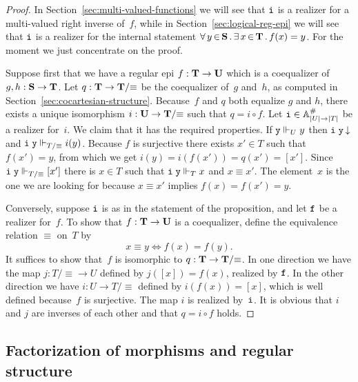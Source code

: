 \begin{proof}
  In Section~\ref{sec:multi-valued-functions} we will see that $\mathtt{i}$
  is a realizer for a multi-valued right inverse of~$f$, while
  in Section~\ref{sec:logical-reg-epi} we will see that $\mathtt{i}$ is a
  realizer for the internal statement
  $\forall\, y \,{\in}\, \mathbf{S}\,.\,\exists\, x \,{\in}\, \mathbf{T}\,.\,f(x) = y$. For the moment we
  just concentrate on the proof.

  Suppose first that we have a regular epi $f : \mathbf{T} \to \mathbf{U}$
  which is a coequalizer of~$g, h : \mathbf{S} \to \mathbf{T}$. Let $q :
  \mathbf{T} \to \mathbf{T}/{\equiv}$ be the coequalizer of~$g$ and~$h$, as
  computed in Section~\ref{sec:cocartesian-structure}. Because~$f$ and
  $q$ both equalize $g$ and $h$, there exists a unique isomorphism $i
  : \mathbf{U} \to \mathbf{T}/{\equiv}$ such that $q = i \circ f$. Let
  $\mathtt{i} \in \mathbb{A}^{\#}_{|U| \to |T|}$ be a realizer for~$i$. We claim
  that it has the required properties. If $\mathtt{y} \Vdash_U y$ then
  $\mathtt{i}\;\mathtt{y}\,{\downarrow}$ and $\mathtt{i}\;\mathtt{y} \Vdash_{T/{\equiv}} i(y)$.
  Because $f$ is surjective there exists $x' \in T$ such that $f(x') =
  y$, from which we get $i(y) = i(f(x')) = q(x') = [x']$. Since
  $\mathtt{i}\;\mathtt{y} \Vdash_{T/{\equiv}} [x']$ there is $x \in T$ such that
  $\mathtt{i}\;\mathtt{y} \Vdash_T x$ and $x \equiv x'$. The element~$x$ is the one
  we are looking for because $x \equiv x'$ implies $f(x) = f(x') = y$.

  Conversely, suppose $\mathtt{i}$ is as in the statement of the
  proposition, and let $\mathtt{f}$ be a realizer for~$f$. To show that $f
  : \mathbf{T} \to \mathbf{U}$ is a coequalizer, define the equivalence
  relation $\equiv$ on~$T$ by
  \begin{equation*}
    x \equiv y \iff f(x) = f(y).
  \end{equation*}
  It suffices to show that~$f$ is isomorphic to $q : \mathbf{T} \to
  \mathbf{T}/{\equiv}$. In one direction we have the map $j : T/{\equiv}
  \to U$ defined by $j([x]) = f(x)$, realized by $\mathtt{f}$. In the other
  direction we have $i : U \to T/{\equiv}$ defined by $i(f(x)) = [x]$,
  which is well defined because~$f$ is surjective. The map $i$ is
  realized by~$\mathtt{i}$. It is obvious that $i$ and $j$ are inverses of
  each other and that $q = i \circ f$ holds.
\end{proof}


\subsection{Factorization of morphisms and regular structure}
\label{sec:factorization}

